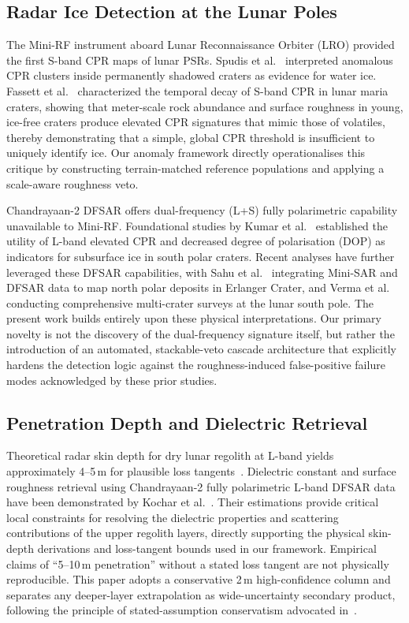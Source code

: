 \documentclass[10pt,conference]{IEEEtran}
\begin{document}
\subsection{Radar Ice Detection at the Lunar Poles}

The Mini-RF instrument aboard Lunar Reconnaissance Orbiter (LRO)
provided the first S-band CPR maps of lunar PSRs.
Spudis et al.~\cite{spudis2013mini} interpreted anomalous CPR clusters
inside permanently shadowed craters as evidence for water ice.
Fassett et al.~\cite{fassett2018} characterized the temporal decay of S-band CPR in lunar maria craters, showing that meter-scale rock abundance and surface roughness in young, ice-free craters produce elevated CPR signatures that mimic those of volatiles, thereby demonstrating that a simple, global CPR threshold is insufficient to uniquely identify ice.
Our anomaly framework directly operationalises this critique by
constructing terrain-matched reference populations and applying a
scale-aware roughness veto.

Chandrayaan-2 DFSAR offers dual-frequency (L+S) fully polarimetric capability unavailable to Mini-RF. Foundational studies by Kumar et al.~\cite{kumar2022dfsar} established the utility of L-band elevated CPR and decreased degree of polarisation (DOP) as indicators for subsurface ice in south polar craters. Recent analyses have further leveraged these DFSAR capabilities, with Sahu et al.~\cite{sahu2024integrated} integrating Mini-SAR and DFSAR data to map north polar deposits in Erlanger Crater, and Verma et al.~\cite{verma2025dfsar} conducting comprehensive multi-crater surveys at the lunar south pole. The present work builds entirely upon these physical interpretations. Our primary novelty is not the discovery of the dual-frequency signature itself, but rather the introduction of an automated, stackable-veto cascade architecture that explicitly hardens the detection logic against the roughness-induced false-positive failure modes acknowledged by these prior studies.

\subsection{Penetration Depth and Dielectric Retrieval}

Theoretical radar skin depth for dry lunar regolith at L-band yields approximately 4--5\,m for plausible loss tangents~\cite{campbell2006}. Dielectric constant and surface roughness retrieval using Chandrayaan-2 fully polarimetric L-band DFSAR data have been demonstrated by Kochar et al.~\cite{kochar2022dielectric,kochar2023roughness}. Their estimations provide critical local constraints for resolving the dielectric properties and scattering contributions of the upper regolith layers, directly supporting the physical skin-depth derivations and loss-tangent bounds used in our framework.
Empirical claims of ``5--10\,m penetration'' without a stated loss
tangent are not physically reproducible.
This paper adopts a conservative 2\,m high-confidence column and
separates any deeper-layer extrapolation as wide-uncertainty
secondary product, following the principle of stated-assumption
conservatism advocated in~\cite{stovern2021}.
\end{document}
